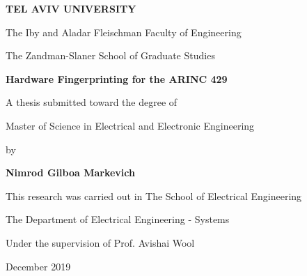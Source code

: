 \begin{titlepage}
\begin{center}
  \vspace*{1cm}
  
  \Large
  \textbf{TEL AVIV UNIVERSITY}
  
  \normalsize
  The Iby and Aladar Fleischman Faculty of Engineering
  
  The Zandman-Slaner School of Graduate Studies
  
  \vspace{0.5cm}
  \LARGE
  \textbf{Hardware Fingerprinting for the ARINC 429}
  
  \vspace{0.5cm}
  
  \vspace{1cm}
  \normalsize
   A thesis submitted toward the degree of
   
   Master of Science in Electrical and Electronic Engineering
   
   \vspace{0.5cm}
   by
   
  \Large
  \textbf{Nimrod Gilboa Markevich}
  
  \vspace{1 cm}
  \normalsize
  This research was carried out in The School of Electrical Engineering
  
  The Department of Electrical Engineering - Systems
  
  Under the supervision of Prof. Avishai Wool
  
  \vspace{0.5cm}
  \large
  December 2019
  
\end{center}
\end{titlepage}
